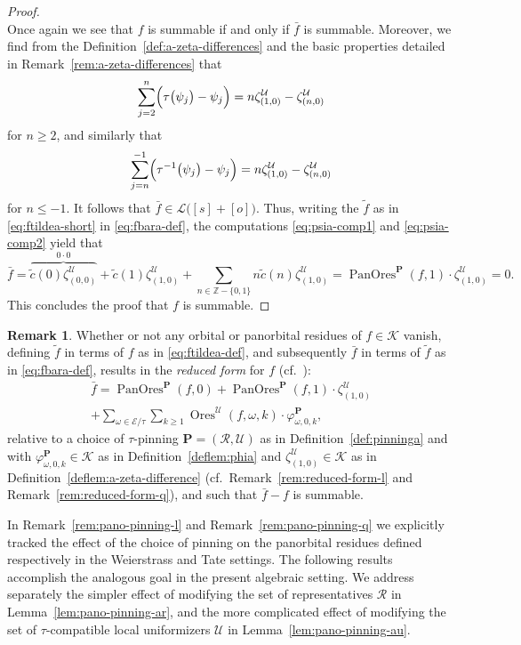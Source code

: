 \documentclass[preprint,12pt]{elsarticle}
\numberwithin{equation}{section} %
\theoremstyle{theorem}
\theoremstyle{definition}
\newtheorem{remark}[theorem]{Remark}
\newcommand{\bk}{\mathcal{K}} %
\newcommand{\ec}{\mathcal{E}} %
\newcommand{\idec}{{o}} %
\newcommand{\orbita}{{\ec/\tau}} %
\newcommand{\za}[2]{\zeta^{\mathcal{U}}_{( {#1} , {#2} )}}
\DeclareMathOperator{\ores}{Ores}
\DeclareMathOperator{\pano}{PanOres}
\begin{document}
\begin{proof}
\begin{equation}
    \end{equation}
    Once again we see that $f$ is summable if and only if $\bar{f}$ is summable. Moreover, we find from the Definition~\ref{def:a-zeta-differences} and the basic properties detailed in Remark~\ref{rem:a-zeta-differences} that
    \begin{equation}\label{eq:psia-comp1}
        \sum_{j=2}^n\Bigl(\tau\bigl(\psi_j\bigr)-\psi_j\Bigr)=n\za{1}{0}-\za{n}{0}
    \end{equation} for $n\geq 2$, and similarly that
    \begin{equation}\label{eq:psia-comp2}
        \sum_{j=n}^{-1}\Bigl(\tau^{-1}\bigl(\psi_j\bigr)-\psi_j\Bigr)=n\za{1}{0}-\za{n}{0}
    \end{equation} for $n\leq -1$. It follows that $\bar{f}\in\mathcal{L}\bigl([s]+[\idec]\bigr)$. Thus, writing the $\tilde{f}$ as in \eqref{eq:ftildea-short} in \eqref{eq:fbara-def}, the computations \eqref{eq:psia-comp1} and \eqref{eq:psia-comp2} yield that \vspace{-.07in}
     \[
        \bar{f}=\overbrace{\tilde{c}(0)\za{0}{0}}^{0\cdot0}+\tilde{c}(1)\za{1}{0}+ \sum_{n\in\mathbb{Z}-\{0,1\}}n\tilde{c}(n)\za{1}{0}=\pano^\mathbf{P}(f,1)\cdot\za{1}{0}=0.
    \] This concludes the proof that $f$ is summable.    \end{proof}

\begin{remark}\label{rem:reduced-form-a}
    Whether or not any orbital or panorbital residues of $f\in\bk$ vanish, defining $\tilde{f}$ in terms of $f$ as in \eqref{eq:ftildea-def}, and subsequently $\bar{f}$ in terms of $\tilde{f}$ as in \eqref{eq:fbara-def}, results in the \emph{reduced form} for $f$ (cf.~\cite[Lem.~B.14]{Dreyfus2018}):
    \begin{multline*}\bar{f}=\pano^\mathbf{P}(f,0)+\pano^\mathbf{P}(f,1)\cdot\za{1}{0}\\+\sum_{\omega\in\orbita}\sum_{k\geq 1}\ores^\mathcal{U}(f,\omega,k)\cdot\varphi^\mathbf{P}_{\omega,0,k},\end{multline*} relative to a choice of $\tau$-pinning $\mathbf{P}=(\mathcal{R},\mathcal{U})$ as in Definition~\ref{def:pinninga} and with $\varphi^\mathbf{P}_{\omega,0,k}\in\bk$ as in Definition~\ref{deflem:phia} and $\za{1}{0}\in\bk$ as in Definition~\ref{deflem:a-zeta-difference} (cf.~Remark~\ref{rem:reduced-form-l} and Remark~\ref{rem:reduced-form-q}), and such that $\bar{f}-f$ is summable.
\end{remark}
    

In Remark~\ref{rem:pano-pinning-l} and Remark~\ref{rem:pano-pinning-q} we explicitly tracked the effect of the choice of pinning on the panorbital residues defined respectively in the Weierstrass and Tate settings. The following results accomplish the analogous goal in the present algebraic setting. We address separately the simpler effect of modifying the set of representatives $\mathcal{R}$ in Lemma~\ref{lem:pano-pinning-ar}, and the more complicated effect of modifying the set of $\tau$-compatible local uniformizers $\mathcal{U}$ in Lemma~\ref{lem:pano-pinning-au}.
\end{document}
